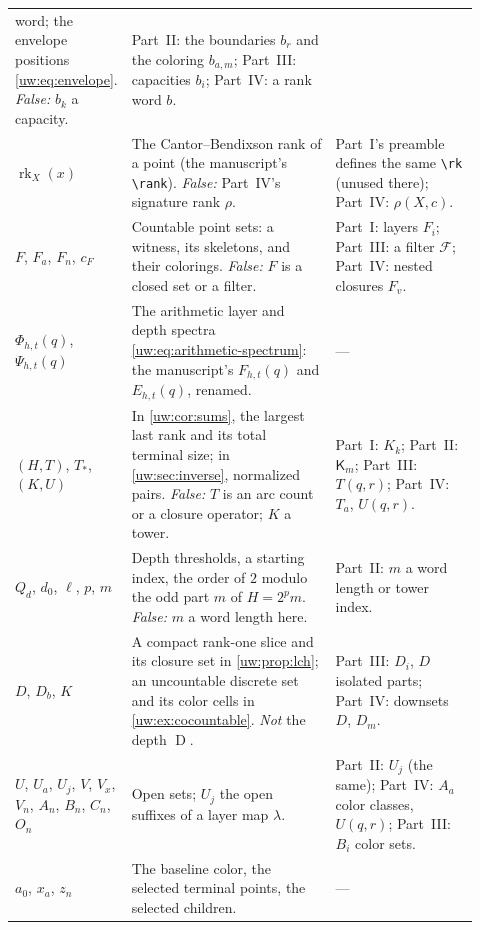 \documentclass[11pt,letterpaper]{article}
\numberwithin{equation}{section}
\theoremstyle{definition}
\theoremstyle{remark}
\theoremstyle{definition}
\newcommand{\rk}{\operatorname{rk}}
\newcommand{\depth}{\operatorname{D}}
\newcommand{\Tw}{\mathsf K}
\newcommand{\F}{\mathcal F}
\begin{document}
\begin{center}
\begin{longtable}{@{}>{\raggedright\arraybackslash}p{0.15\linewidth}>{\raggedright\arraybackslash}p{0.45\linewidth}>{\raggedright\arraybackslash}p{0.32\linewidth}@{}}
word; the envelope positions \eqref{uw:eq:envelope}. \emph{False:} $b_k$ a
capacity. & Part~II: the boundaries $b_r$ and the coloring $b_{a,m}$;
Part~III: capacities $b_i$; Part~IV: a rank word $b$.\\
$\rk_X(x)$ & The Cantor--Bendixson rank of a point (the manuscript's
\verb|\rank|). \emph{False:} Part~IV's signature rank $\rho$. & Part~I's
preamble defines the same \verb|\rk| (unused there); Part~IV:
$\rho(X,c)$.\\
$F$, $F_a$, $F_n$, $c_F$ & Countable point sets: a witness, its skeletons,
and their colorings. \emph{False:} $F$ is a closed set or a filter. &
Part~I: layers $F_i$; Part~III: a filter $\F$; Part~IV: nested closures
$F_v$.\\
$\Phi_{h,t}(q)$, $\Psi_{h,t}(q)$ & The arithmetic layer and depth spectra
\eqref{uw:eq:arithmetic-spectrum}: the manuscript's $F_{h,t}(q)$ and
$E_{h,t}(q)$, renamed. & ---\\
$(H,T)$, $T_*$, $(K,U)$ & In \cref{uw:cor:sums}, the largest last rank and
its total terminal size; in \cref{uw:sec:inverse}, normalized pairs.
\emph{False:} $T$ is an arc count or a closure operator; $K$ a tower. &
Part~I: $K_k$; Part~II: $\Tw_m$; Part~III: $T(q,r)$; Part~IV: $T_a$,
$U(q,r)$.\\
$Q_d$, $d_0$, $\ell$, $p$, $m$ & Depth thresholds, a starting index, the
order of $2$ modulo the odd part $m$ of $H=2^pm$. \emph{False:} $m$ a word
length here. & Part~II: $m$ a word length or tower index.\\
$D$, $D_b$, $K$ & A compact rank-one slice and its closure set in
\cref{uw:prop:lch}; an uncountable discrete set and its color cells in
\cref{uw:ex:cocountable}. \emph{Not} the depth $\depth$. & Part~III: $D_i$,
$D$ isolated parts; Part~IV: downsets $D$, $D_m$.\\
$U$, $U_a$, $U_j$, $V$, $V_x$, $V_n$, $A_n$, $B_n$, $C_n$, $O_n$ & Open
sets; $U_j$ the open suffixes of a layer map $\lambda$. & Part~II: $U_j$ (the
same); Part~IV: $A_a$ color classes, $U(q,r)$; Part~III: $B_i$ color sets.\\
$a_0$, $x_a$, $z_n$ & The baseline color, the selected terminal points, the
selected children. & ---\\
\bottomrule
\end{longtable}
\end{center}
\end{document}

